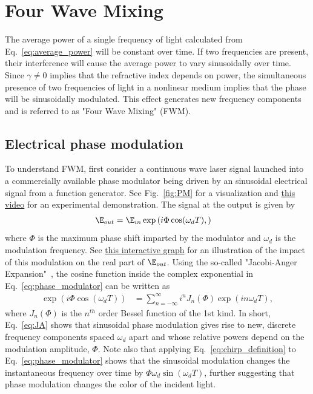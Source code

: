 \chapter{Four Wave Mixing}
\label{ch:FWM}

The average power of a single frequency of light calculated from Eq.~\ref{eq:average_power} will be constant over time. If two frequencies are present, their interference will cause the average power to vary sinusoidally over time. Since $\gamma\neq0$ implies that the refractive index depends on power, the simultaneous presence of two frequencies of light in a nonlinear medium implies that the phase will be sinusoidally modulated. This effect generates new frequency components and is referred to as "Four Wave Mixing" (FWM).




\section{Electrical phase modulation}
To understand FWM, first consider a continuous wave laser signal launched into a commercially available phase modulator being driven by an sinusoidal electrical signal from a function generator. See Fig.~\ref{fig:PM} for a visualization and \href{https://youtu.be/j8It3to54AQ}{this video} for an experimental demonstration. The signal at the output is given by
\begin{align}
    \label{eq:phase_modulator}
    \E_{out}&=\E_{in}\exp\left(i\Phi\cos(\omega_dT), \right)
\end{align}
where $\Phi$ is the maximum phase shift imparted by the modulator and $\omega_d$ is the modulation frequency. See \href{https://www.desmos.com/calculator/vcreo1gs2q}{this interactive graph} for an illustration of the impact of this modulation on the real part of $\E_{out}$. Using the so-called "Jacobi-Anger Expansion"~\cite{NIST_JA_expansion}, the cosine function inside the complex exponential in Eq.~\ref{eq:phase_modulator} can be written as
\begin{align}
\label{eq:JA}
    \exp\left(i\Phi\cos(\omega_dT)\right) &= \sum_{n=-\infty}^{\infty}i^n J_n(\Phi) \exp\left(in\omega_dT\right),
\end{align}
where $J_n(\Phi)$ is the $n^{th}$ order Bessel function of the 1st kind. In short, Eq.~\ref{eq:JA} shows that sinusoidal phase modulation gives rise to new, discrete frequency components spaced $\omega_d$ apart and whose relative powers depend on the modulation amplitude, $\Phi$. Note also that applying Eq.~\ref{eq:chirp_definition} to Eq.~\ref{eq:phase_modulator} shows that the sinusoidal modulation changes the instantaneous frequency over time by $\Phi\omega_d\sin(\omega_dT)$, further suggesting that phase modulation changes the color of the incident light.

